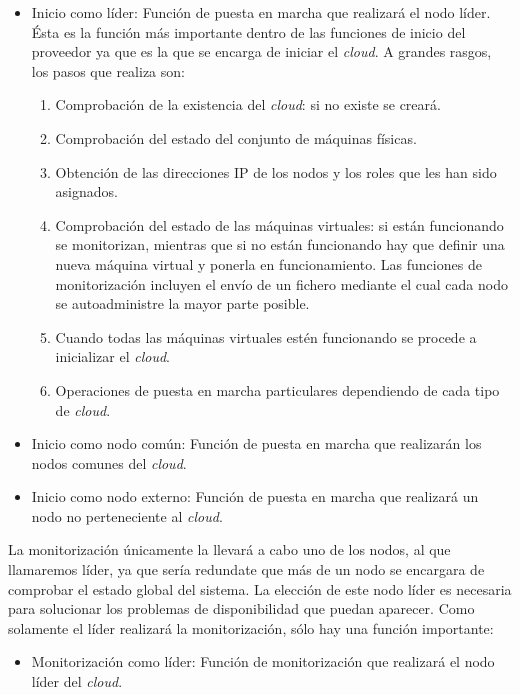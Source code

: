 \begin{itemize}
\item Inicio como líder: Función de puesta en marcha que realizará el nodo líder. Ésta es la función más importante dentro de las funciones de inicio del proveedor ya que es la que se encarga de iniciar el \emph{cloud}. A grandes rasgos, los pasos que realiza son:

   \begin{enumerate}
   \item Comprobación de la existencia del \emph{cloud}: si no existe se creará.
   \item Comprobación del estado del conjunto de máquinas físicas.
   \item Obtención de las direcciones IP de los nodos y los roles que les han sido asignados.
   \item Comprobación del estado de las máquinas virtuales: si están funcionando se monitorizan, mientras que si no están funcionando hay que definir una nueva máquina virtual y ponerla en funcionamiento. Las funciones de monitorización incluyen el envío de un fichero mediante el cual cada nodo se autoadministre la mayor parte posible.
   \item Cuando todas las máquinas virtuales estén funcionando se procede a inicializar el \emph{cloud}.
   \item Operaciones de puesta en marcha particulares dependiendo de cada tipo de \emph{cloud}.
   \end{enumerate}

\item Inicio como nodo común: Función de puesta en marcha que realizarán los nodos comunes del \emph{cloud}.
\item Inicio como nodo externo: Función de puesta en marcha que realizará un nodo no perteneciente al \emph{cloud}.
\end{itemize}

La monitorización únicamente la llevará a cabo uno de los nodos, al que llamaremos líder, ya que sería redundate que más de un nodo se encargara de comprobar el estado global del sistema. La elección de este nodo líder es necesaria para solucionar los problemas de disponibilidad que puedan aparecer. Como solamente el líder realizará la monitorización, sólo hay una función importante:

\begin{itemize}
\item Monitorización como líder: Función de monitorización que realizará el nodo líder del \emph{cloud}.
\end{itemize}

